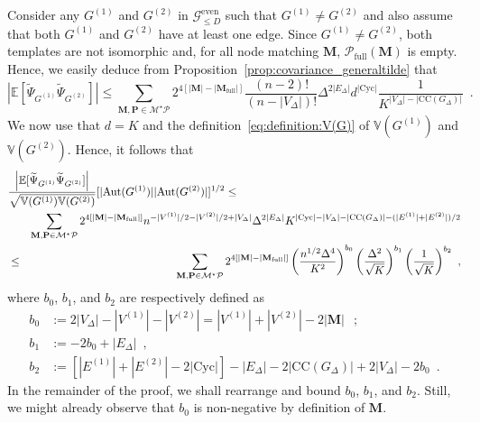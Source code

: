 \documentclass{article}
\begin{document}
    Consider any $G^{(1)}$ and $G^{(2)}$ in $\mathcal G_{\leq D}^{\mathrm{even}}$ such that $G^{(1)} \neq G^{(2)}$ and also assume that both $G^{(1)}$ and $G^{(2)}$ have at least one edge.  Since $G^{(1)}\neq G^{(2)}$, both templates are not isomorphic and, for all node matching $\mathbf{M}$, $\mathcal{P}_{\mathrm{full}}(\mathbf{M})$ is empty. Hence, we easily deduce from Proposition~\ref{prop:covariance_generaltilde} that
\begin{equation}\label{eq:control_covariance:PT}
    \left| \mathbb{E}[\widetilde{\Psi}_{G^{(1)}} \widetilde{\Psi}_{G^{(2)}}]\right|\leq  \sum_{\mathbf{M},\mathbf{P}\in \mathcal{M}^{\star}\mathcal{P}} 2^{4[|\mathbf M|- |\mathbf M_{\mathrm{full}}|]} \frac{(n-2)!}{(n-|V_{\Delta}|)!} \Delta^{2|E_{\Delta}|}d^{|\mathrm{Cyc}|}\frac{1}{K^{|V_{\Delta}|-|\mathrm{CC}(G_{\Delta})|}} \enspace . 
\end{equation}
We now use that $d=K$ and the definition~\eqref{eq:definition:V(G)} of $\mathbb{V}(G^{(1)})$ and $\mathbb{V}(G^{(2)})$. Hence, it follows that
\begin{eqnarray}\lefteqn{\frac{ \left| \mathbb{E}[\widetilde{\Psi}_{G^{(1)}} \widetilde{\Psi}_{G^{(2)}}]\right|}{\sqrt{\mathbb{V}(G^{(1)})\mathbb{V}(G^{(2)})}}[|\mathrm{Aut}(G^{(1)})||\mathrm{Aut}(G^{(2)})|]^{1/2} \leq} & &\nonumber\\ 
    & &\sum_{\mathbf{M},\mathbf{P}\in \mathcal{M}^{\star}\mathcal{P}}  2^{4[|\mathbf M|- |\mathbf M_{\mathrm{full}}|]}n^{-|V^{(1)}|/2-|V^{(2)}|/2+|V_{\Delta}|} \Delta^{2|E_{\Delta}|}{K^{|\mathrm{Cyc}|-|V_{\Delta}|-|\mathrm{CC}(G_{\Delta})|-(|E^{(1)}|+|E^{(2)}|)/2}} \nonumber \\   \label{eq:control_covariance:PT:bis}
&\leq &   \sum_{\mathbf{M},\mathbf{P}\in \mathcal{M}^{\star}\mathcal{P}} 2^{4[|\mathbf M|- |\mathbf M_{\mathrm{full}}|]} \left(\frac{n^{1/2}\Delta^4}{K^{2}}\right)^{b_0} \left(\frac{\Delta^{2}}{\sqrt{K}}\right)^{b_1} \left(\frac{1}{\sqrt{K}}\right)^{b_2} \ ,
\end{eqnarray}
where $b_0$, $b_1$, and $b_2$ are respectively defined as 
\begin{align}\label{eq:expression_b0}
b_0&:= 2|V_{\Delta}|-|V^{(1)}|- |V^{(2)}| = |V^{(1)}| + |V^{(2)}| - 2|\mathbf{M}|\enspace \ ;\\
\label{eq:defintion:b1}
    b_1& := -2b_0 + |E_{\Delta}| \enspace ,\\
\label{eq:defintion:b2}
b_2 &:= \left[|E^{(1)}|+ |E^{(2)}| - 2|\mathrm{Cyc}|\right] -|E_{\Delta}| - 2|\mathrm{CC}(G_{\Delta})| + 2 |V_{\Delta}|  - 2b_0\enspace . 
\end{align}
In the remainder of the proof, we shall rearrange and bound $b_0$, $b_1$, and $b_2$. Still, we might already observe that $b_0$ is non-negative by definition of $\mathbf{M}$. 
\end{document}
